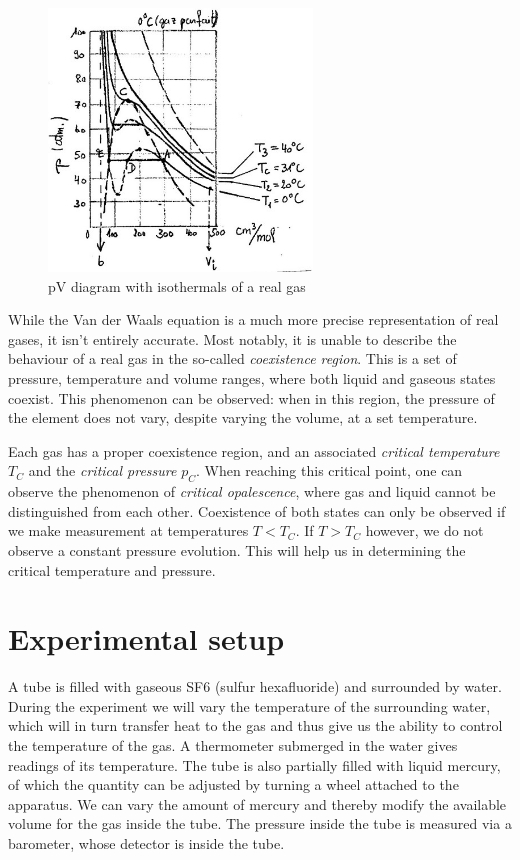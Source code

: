 \documentclass{scrartcl}
\begin{document}
\begin{figure}[h]
   \centering
    \includegraphics[width=7cm]{pvDiagramExample.jpg}
    \caption{pV diagram with isothermals of a real gas}
    \label{fig:1}
\end{figure}

While the Van der Waals equation is a much more precise representation of real gases, it isn't entirely accurate. Most notably, it is unable to describe the behaviour of a real gas in the so-called \textit{coexistence region}. 
This is a set of pressure, temperature and volume ranges, where both liquid and gaseous states coexist. This phenomenon can be observed: when in this region, the pressure of the element does not vary, despite varying the volume, at a set temperature.

\medskip 

Each gas has a proper coexistence region, and an associated \textit{critical temperature} $T_C$ and the \textit{critical pressure} $p_C$. When reaching this critical point, one can observe the phenomenon of \textit{critical opalescence}, where gas and liquid cannot be distinguished from each other. Coexistence of both states can only be observed if we make measurement at temperatures $T < T_C$. If $T > T_C$ however, we do not observe a constant pressure evolution. This will help us in determining the critical temperature and pressure. 

\section{Experimental setup}

A tube is filled with gaseous SF6 (sulfur hexafluoride) and surrounded by water. During the experiment we will vary the temperature of the surrounding water, which will in turn transfer heat to the gas and thus give us the ability to control the temperature of the gas. A thermometer submerged in the water gives readings of its temperature. The tube is also partially filled with liquid mercury, of which the quantity can be adjusted by turning a wheel attached to the apparatus. We can vary the amount of mercury and thereby modify the available volume for the gas inside the tube. The pressure inside the tube is measured via a barometer, whose detector is inside the tube.
\end{document}
